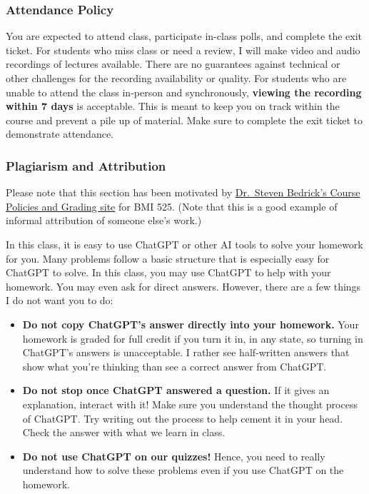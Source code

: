 \documentclass[
  letterpaper,
  DIV=11,
  numbers=noendperiod]{scrartcl}
\begin{document}
\hypertarget{attendance-policy}{%
\subsubsection{Attendance Policy}\label{attendance-policy}}

You are expected to attend class, participate in-class polls, and
complete the exit ticket. For students who miss class or need a review,
I will make video and audio recordings of lectures available. There are
no guarantees against technical or other challenges for the recording
availability or quality. For students who are unable to attend the class
in-person and synchronously, \textbf{viewing the recording within 7
days} is acceptable. This is meant to keep you on track within the
course and prevent a pile up of material. Make sure to complete the exit
ticket to demonstrate attendance.

\hypertarget{plagiarism-and-attribution}{%
\subsubsection{Plagiarism and
Attribution}\label{plagiarism-and-attribution}}

Please note that this section has been motivated by
\href{https://dmice.ohsu.edu/bedricks/courses/bmi525/policies.html}{Dr.~Steven
Bedrick's Course Policies and Grading site} for BMI 525. (Note that this
is a good example of informal attribution of someone else's work.)

In this class, it is easy to use ChatGPT or other AI tools to solve your
homework for you. Many problems follow a basic structure that is
especially easy for ChatGPT to solve. In this class, you may use ChatGPT
to help with your homework. You may even ask for direct answers.
However, there are a few things I do not want you to do:

\begin{itemize}
\item
  \textbf{Do not copy ChatGPT's answer directly into your homework.}
  Your homework is graded for full credit if you turn it in, in any
  state, so turning in ChatGPT's answers is unacceptable. I rather see
  half-written answers that show what you're thinking than see a correct
  answer from ChatGPT.
\item
  \textbf{Do not stop once ChatGPT answered a question.} If it gives an
  explanation, interact with it! Make sure you understand the thought
  process of ChatGPT. Try writing out the process to help cement it in
  your head. Check the answer with what we learn in class.
\item
  \textbf{Do not use ChatGPT on our quizzes!} Hence, you need to really
  understand how to solve these problems even if you use ChatGPT on the
  homework.
\end{itemize}
\end{document}
